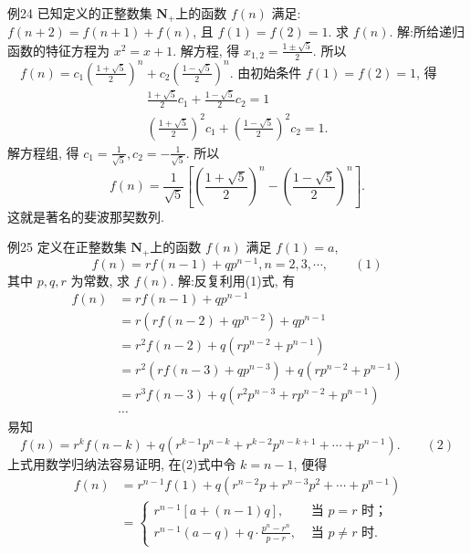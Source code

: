 例24 已知定义的正整数集 $\mathbf{N}_{+}$上的函数 $f(n)$ 满足: $f(n+2)=f(n+1)+f(n)$, 且 $f(1)=f(2)=1$. 求 $f(n)$.
解:所给递归函数的特征方程为 $x^2=x+1$. 解方程, 得 $x_{1,2}=\frac{1 \pm \sqrt{5}}{2}$.
所以 $\quad f(n)=c_1\left(\frac{1+\sqrt{5}}{2}\right)^n+c_2\left(\frac{1-\sqrt{5}}{2}\right)^n$.
由初始条件 $f(1)=f(2)=1$, 得
$$
\begin{gathered}
\frac{1+\sqrt{5}}{2} c_1+\frac{1-\sqrt{5}}{2} c_2=1 \\
\left(\frac{1+\sqrt{5}}{2}\right)^2 c_1+\left(\frac{1-\sqrt{5}}{2}\right)^2 c_2=1 .
\end{gathered}
$$
解方程组, 得 $c_1=\frac{1}{\sqrt{5}}, c_2=-\frac{1}{\sqrt{5}}$. 所以
$$
f(n)=\frac{1}{\sqrt{5}}\left[\left(\frac{1+\sqrt{5}}{2}\right)^n-\left(\frac{1-\sqrt{5}}{2}\right)^n\right] .
$$
这就是著名的斐波那契数列.



例25 定义在正整数集 $\mathbf{N}_{+}$上的函数 $f(n)$ 满足 $f(1)=a$,
$$
f(n)=r f(n-1)+q p^{n-1}, n=2,3, \cdots, \quad\quad (1)
$$
其中 $p, q, r$ 为常数, 求 $f(n)$.
解:反复利用(1)式, 有
$$
\begin{aligned}
f(n) & =r f(n-1)+q p^{n-1} \\
& =r\left(r f(n-2)+q p^{n-2}\right)+q p^{n-1} \\
& =r^2 f(n-2)+q\left(r p^{n-2}+p^{n-1}\right) \\
& =r^2\left(r f(n-3)+q p^{n-3}\right)+q\left(r p^{n-2}+p^{n-1}\right) \\
& =r^3 f(n-3)+q\left(r^2 p^{n-3}+r p^{n-2}+p^{n-1}\right) \\
& \cdots
\end{aligned}
$$
易知
$$
f(n)=r^k f(n-k)+q\left(r^{k-1} p^{n-k}+r^{k-2} p^{n-k+1}+\cdots+p^{n-1}\right) . \quad\quad (2)
$$
上式用数学归纳法容易证明, 在(2)式中令 $k=n-1$, 便得
$$
\begin{aligned}
f(n) & =r^{n-1} f(1)+q\left(r^{n-2} p+r^{n-3} p^2+\cdots+p^{n-1}\right) \\
& = \begin{cases}r^{n-1}[a+(n-1) q], & \text { 当 } p=r \text { 时； } \\
r^{n-1}(a-q)+q \cdot \frac{p^n-r^n}{p-r}, & \text { 当 } p \neq r \text { 时.
}\end{cases}
\end{aligned}
$$



